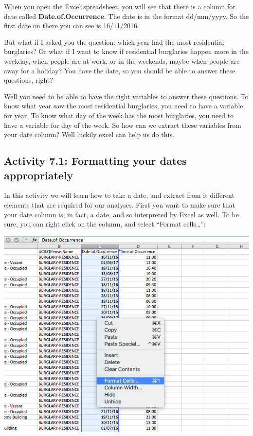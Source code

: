 \documentclass[
]{book}
\begin{document}
When you open the Excel spreadsheet, you will see that there is a column for date called \textbf{Date.of.Occurrence}. The date is in the format dd/mm/yyyy. So the first date on there you can see is 16/11/2016.

But what if I asked you the question: which year had the most residential burglaries? Or what if I want to know if residential burglaries happen more in the weekday, when people are at work, or in the weekends, maybe when people are away for a holiday? You have the date, so you should be able to answer these questions, right?

Well you need to be able to have the right variables to answer these questions. To know what year saw the most residential burglaries, you need to have a variable for year. To know what day of the week has the most burglaries, you need to have a variable for day of the week. So how can we extract these variables from your date column? Well luckily excel can help us do this.

\hypertarget{activity-7.1-formatting-your-dates-appropriately}{%
\subsection{Activity 7.1: Formatting your dates appropriately}\label{activity-7.1-formatting-your-dates-appropriately}}

In this activity we will learn how to take a date, and extract from it different elements that are required for our analyses. First you want to make sure that your date column is, in fact, a date, and so interpreted by Excel as well. To be sure, you can right click on the column, and select ``Format cells\ldots{}'':

\includegraphics{imgs/format_date_1.png}
\end{document}

